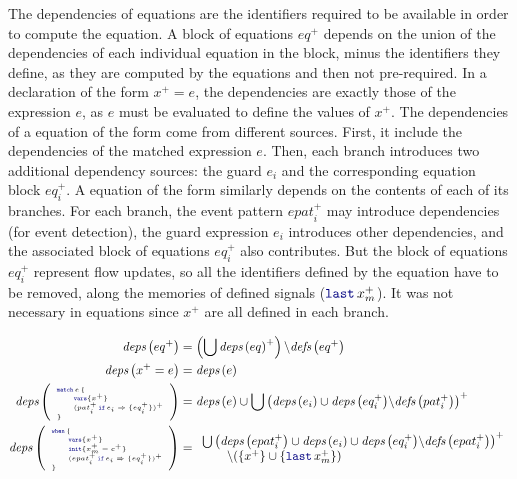 The dependencies of equations are the identifiers required to be available in order to compute the
equation.
%
A block of equations $eq^+$ depends on the union of the dependencies of each individual equation in
the block, minus the identifiers they define, as they are computed by the equations and then not
pre-required.
%
In a declaration of the form $x^+ = e$, the dependencies are exactly those of the expression $e$, as
$e$ must be evaluated to define the values of $x^+$.
%
The dependencies of a  equation of the form  come from different sources. First, it include the
dependencies of the matched expression $e$. Then, each branch introduces two additional dependency
sources: the guard $e_i$ and the corresponding equation block $eq_i^+$.
%
A  equation of the form 
similarly depends on the contents of each of its branches. For each branch, the event pattern
$epat_i^+$ may introduce dependencies (\eg for event detection), the guard expression $e_i$
introduces other dependencies, and the associated block of equations $eq_i^+$ also contributes.
But the block of equations $eq_i^+$ represent flow updates, so all the identifiers defined by the
 equation have to be removed, along the memories of defined signals ($\last{x_m}^+$). It
was not necessary in  equations since $x^+$ are all defined in each branch.

\begin{align}
    \deps{eq^+}                                                                      & =
    \left(\bigcup \deps{eq}^+\right) \backslash \defs{eq^+}
    \label{rule:semantics:grsync:causality:dependencies:deps:eq}                         \\
    \deps{x^+ = e}                                                                   & =
    \deps{e}
    \label{rule:semantics:grsync:causality:dependencies:deps:eq:decl}                    \\
    \deps{\mathtiny{\matchTab{e}{x^+}{(\branch{pat_i^+}{e_i}{eq_i^+})^+}}}           & =
    \deps{e} \cup \bigcup \left(\deps{e_i} \cup \deps{eq_i^+} \backslash \defs{pat_i^+}\right)^+
    \label{rule:semantics:grsync:causality:dependencies:deps:eq:match}                   \\
    \deps{\mathtiny{\whenTab{x^+}{x_m^+ = c^+}{(\branch{epat_i^+}{e_i}{eq_i^+})^+}}} & =
    \begin{array}{l}
        \bigcup \left(\deps{epat_i^+} \cup \deps{e_i} \cup \deps{eq_i^+} \backslash \defs{epat_i^+}\right)^+ \\
        \qquad \backslash (\{x^+\} \cup \{\last{x_m}^+\})
    \end{array}
    \label{rule:semantics:grsync:causality:dependencies:deps:eq:when}
\end{align}

